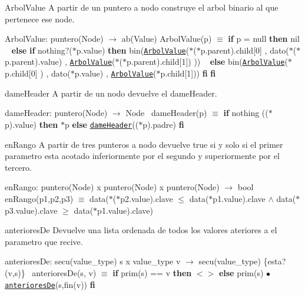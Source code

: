 \begin{DoxyParagraph}{Arbol\+Value}
A partir de un puntero a nodo construye el arbol binario al que pertenece ese node.

Arbol\+Value\+: puntero(\+Node) $\to$ ab(\+Value) Arbol\+Value(p) $\equiv$ {\bfseries if} p = null {\bfseries then} nil ~\newline
 {\bfseries else} {\bfseries if} nothing?($\ast$p.value) {\bfseries then} bin(\href{axiomas.html#ArbolValue}{\tt Arbol\+Value}($\ast$($\ast$p.parent).child\mbox{[}0\mbox{]} , dato($\ast$($\ast$p.parent).value) , \href{axiomas.html#ArbolValue}{\tt Arbol\+Value}($\ast$($\ast$p.parent).child\mbox{[}1\mbox{]}) )) ~\newline
 {\bfseries else} bin(\href{axiomas.html#ArbolValue}{\tt Arbol\+Value}($\ast$p.child\mbox{[}0\mbox{]} ) , dato($\ast$p.value) , \href{axiomas.html#ArbolValue}{\tt Arbol\+Value}($\ast$p.child\mbox{[}1\mbox{]})) {\bfseries fi} {\bfseries fi} 
\end{DoxyParagraph}


\begin{DoxyParagraph}{dame\+Header}
A partir de un nodo devuelve el dame\+Header.

dame\+Header\+: puntero(\+Node) $\to$ Node~\newline
 dame\+Header(p) $\equiv$ {\bfseries if} nothing (($\ast$p).value) {\bfseries then} $\ast$p {\bfseries else} \href{axiomas.html#dameHeader}{\tt dame\+Header}(($\ast$p).padre) {\bfseries fi} 
\end{DoxyParagraph}


\begin{DoxyParagraph}{en\+Rango}
A partir de tres punteros a nodo devuelve true si y solo si el primer parametro esta acotado inferiormente por el segundo y superiormente por el tercero.

en\+Rango\+: puntero(\+Node) x puntero(\+Node) x puntero(\+Node) $\to$ bool~\newline
 en\+Rango(p1,p2,p3) $\equiv$ data($\ast$($\ast$p2.value).clave $\leq$ data($\ast$p1.value).clave $\land$ data($\ast$p3.value).clave $\geq$ data($\ast$p1.value).clave) 
\end{DoxyParagraph}


\begin{DoxyParagraph}{anteriores\+De}
Devuelve una lista ordenada de todos los valores ateriores a el parametro que recive.

anteriores\+De\+: secu(value\+\_\+type) s x value\+\_\+type v $\to$ secu(value\+\_\+type) \{esta?(v,s)\}~\newline
 anteriores\+De(s, v) $\equiv$ {\bfseries if} prim(s) == v {\bfseries then} $<$$>$ {\bfseries else} prim(s) $\bullet$ \href{axiomas.html#anterioresDe}{\tt anteriores\+De}(s,fin(v)) {\bfseries fi} 
\end{DoxyParagraph}


